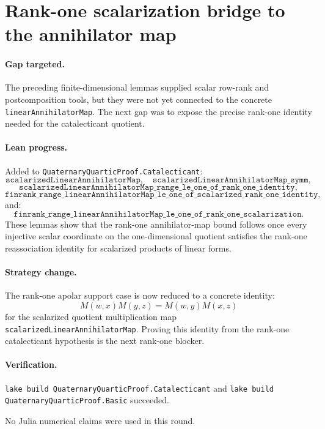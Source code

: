 \documentclass[11pt]{article}
\begin{document}
\section*{Rank-one scalarization bridge to the annihilator map}

\paragraph{Gap targeted.}
The preceding finite-dimensional lemmas supplied scalar row-rank and
postcomposition tools, but they were not yet connected to the concrete
\texttt{linearAnnihilatorMap}.  The next gap was to expose the precise
rank-one identity needed for the catalecticant quotient.

\paragraph{Lean progress.}
Added to \texttt{QuaternaryQuarticProof.Catalecticant}:
\[
\texttt{scalarizedLinearAnnihilatorMap},
\quad
\texttt{scalarizedLinearAnnihilatorMap\_symm},
\]
\[
\texttt{scalarizedLinearAnnihilatorMap\_range\_le\_one\_of\_rank\_one\_identity},
\]
\[
\texttt{finrank\_range\_linearAnnihilatorMap\_le\_one\_of\_scalarized\_rank\_one\_identity},
\]
and:
\[
\texttt{finrank\_range\_linearAnnihilatorMap\_le\_one\_of\_rank\_one\_scalarization}.
\]
These lemmas show that the rank-one annihilator-map bound follows once every
injective scalar coordinate on the one-dimensional quotient satisfies the
rank-one reassociation identity for scalarized products of linear forms.

\paragraph{Strategy change.}
The rank-one apolar support case is now reduced to a concrete identity:
\[
M(w,x)M(y,z)=M(w,y)M(x,z)
\]
for the scalarized quotient multiplication map
\texttt{scalarizedLinearAnnihilatorMap}.  Proving this identity from the
rank-one catalecticant hypothesis is the next rank-one blocker.

\paragraph{Verification.}
\texttt{lake build QuaternaryQuarticProof.Catalecticant} and
\texttt{lake build QuaternaryQuarticProof.Basic} succeeded.

No Julia numerical claims were used in this round.
\end{document}
